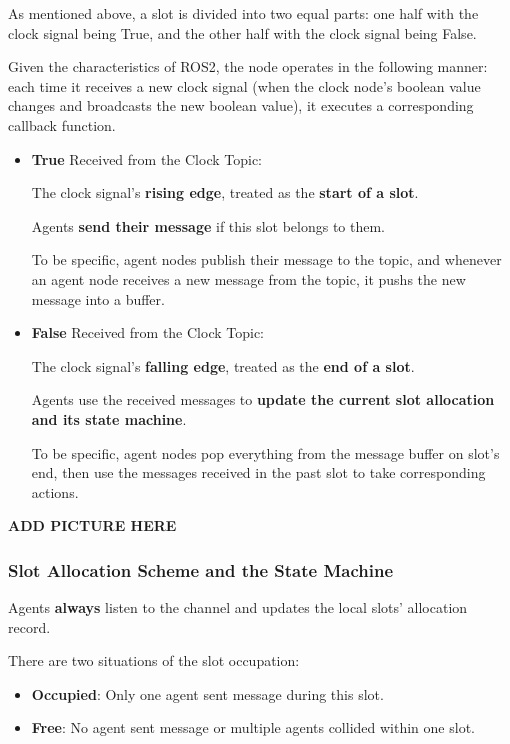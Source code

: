 {As mentioned above, a slot is divided into two equal parts: one half with the clock signal being True, and the other half with the clock signal being False.

Given the characteristics of ROS2, the node operates in the following manner: each time it receives a new clock signal (when the clock node's boolean value changes and broadcasts the new boolean value), it executes a corresponding callback function.

\begin{itemize}
    \item \textbf{True} Received from the Clock Topic: 
    
    The clock signal's \textbf{rising edge}, treated as the \textbf{start of a slot}.

    Agents \textbf{send their message} if this slot belongs to them. 

    To be specific, agent nodes publish their message to the topic, and whenever an agent node receives a new message from the topic, it pushs the new message into a buffer.

    
    \item \textbf{False} Received from the Clock Topic:
    
    The clock signal's \textbf{falling edge}, treated as the \textbf{end of a slot}.
    
    Agents use the received messages to \textbf{update the current slot allocation and its state machine}.

    To be specific, agent nodes pop everything from the message buffer on slot's end, then use the messages received in the past slot to take corresponding actions.

\end{itemize}

\textbf{ADD PICTURE HERE}

\subsubsection{Slot Allocation Scheme and the State Machine}

Agents \textbf{always} listen to the channel and updates the local slots' allocation record.

There are two situations of the slot occupation:
\begin{itemize}
    \item \textbf{Occupied}: Only one agent sent message during this slot.
    \item \textbf{Free}: No agent sent message or multiple agents collided within one slot.
\end{itemize}

}
